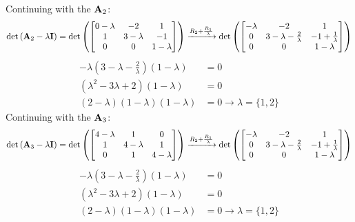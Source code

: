 Continuing with the $\mathbf{A}_2$:
\begin{equation*}
    \det{\left(\mathbf{A}_2 - \lambda\mathbf{I}\right)} = 
    \det{\left(\begin{bmatrix}
        0 - \lambda & -2 &  1 \\
        1 &  3 - \lambda & -1 \\
        0 & 0 & 1 - \lambda
    \end{bmatrix}\right)} \xrightarrow{R_2 + \frac{R_1}{\lambda}}
    \det{\left(\begin{bmatrix}
        - \lambda & -2 &  1 \\
        0 &  3 - \lambda - \frac{2}{\lambda} & -1 + \frac{1}{\lambda} \\
        0 & 0 & 1 - \lambda
    \end{bmatrix}\right)}
\end{equation*}
\begin{align*}
    -\lambda(3 - \lambda - \frac{2}{\lambda})(1 - \lambda) &= 0\\
    (\lambda^2 - 3\lambda + 2)(1 - \lambda) &= 0\\
    (2 - \lambda)(1 - \lambda)(1 - \lambda) &= 0\rightarrow\lambda = \{1, 2\}
\end{align*}
Continuing with the $\mathbf{A}_3$:
\begin{equation*}
    \det{\left(\mathbf{A}_3 - \lambda\mathbf{I}\right)} = 
    \det{\left(\begin{bmatrix}
        4 - \lambda & 1 &  0 \\
        1 &  4 - \lambda & 1 \\
        0 & 1 & 4 - \lambda
    \end{bmatrix}\right)} \xrightarrow{R_2 + \frac{R_1}{\lambda}}
    \det{\left(\begin{bmatrix}
        - \lambda & -2 &  1 \\
        0 &  3 - \lambda - \frac{2}{\lambda} & -1 + \frac{1}{\lambda} \\
        0 & 0 & 1 - \lambda
    \end{bmatrix}\right)}
\end{equation*}
\begin{align*}
    -\lambda(3 - \lambda - \frac{2}{\lambda})(1 - \lambda) &= 0\\
    (\lambda^2 - 3\lambda + 2)(1 - \lambda) &= 0\\
    (2 - \lambda)(1 - \lambda)(1 - \lambda) &= 0\rightarrow\lambda = \{1, 2\}
\end{align*}


